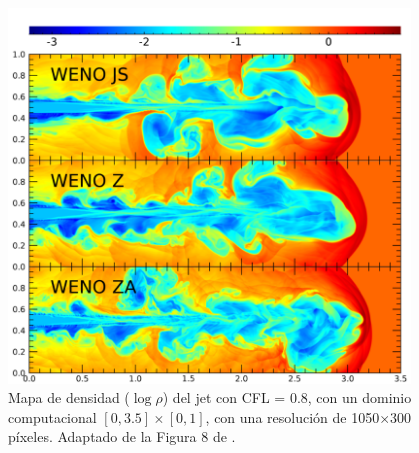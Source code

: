 \documentclass[12pt,a4paper]{book}
\begin{document}
\begin{figure}
    \begin{center}
      \includegraphics[width=0.95\textwidth]{Figuras/capitulo_1/jet_ejemplo_2.png}
    \end{center}
    \caption{Mapa de densidad ($\log \rho$) del jet con CFL = 0.8, con un dominio computacional $\left[0, 3.5\right] \times \left[0, 1\right]$, con una resolución de 1050$\times$300 píxeles. Adaptado de la Figura 8 
    de \citet{Seo2021}.}
    \label{fig:jet_ejemplo_2}
\end{figure}
\end{document}
